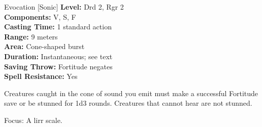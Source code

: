 {Evocation [Sonic]}
{
	\textbf{Level:}
	Drd 2, Rgr 2\\
	\textbf{Components:}
	V, S, F\\
	\textbf{Casting Time:}
	1 standard action\\
	\textbf{Range:}
	9 meters\\
	\textbf{Area:}
	Cone-shaped burst\\
	\textbf{Duration:}
	Instantaneous; see text\\
	\textbf{Saving Throw:}
	Fortitude negates\\
	\textbf{Spell Resistance:}
	Yes\\
}
{
	Creatures caught in the cone of sound you emit must make a successful Fortitude save or be stunned for 1d3 rounds. Creatures that cannot hear are not stunned.

	Focus: A lirr scale.
}
